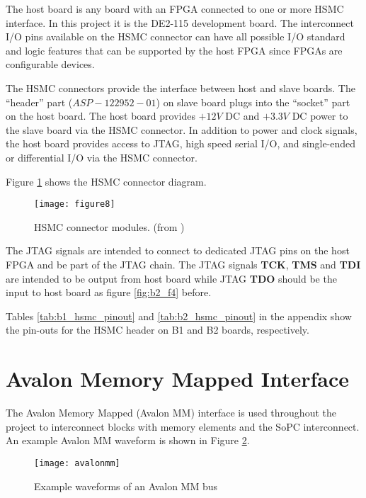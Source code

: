The host board is any board with an FPGA connected to one or more HSMC interface. In this project it is the DE2-115 development board.
The interconnect I/O pins available on the HSMC connector can have all possible I/O standard and
logic features that can be supported by the host FPGA since FPGAs are configurable devices.

The HSMC connectors provide the interface between host and slave boards. The ``header''
part ($ASP-122952-01$) on slave board plugs into the ``socket'' part on the host board. The host
board provides $+12V$ DC and $+3.3V$ DC power to the slave board via the HSMC connector.
In addition to power and clock signals, the host board provides access to JTAG,
high speed serial I/O, and single-ended or differential I/O via the HSMC connector.

Figure \ref{fig:b2_f8} shows the HSMC connector diagram.

\begin{figure}
 \centering
 \texttt{[image: figure8]}
 \caption{HSMC connector modules. (from \citep{Altera:2009:HSMCspec})}
 \label{fig:b2_f8}
\end{figure}

The JTAG signals are intended to connect to dedicated JTAG pins on the host FPGA and
be part of the JTAG chain. The JTAG signals \textbf{TCK}, \textbf{TMS} and \textbf{TDI} are intended to be
output from host board while JTAG \textbf{TDO} should be the input to host board as figure \ref{fig:b2_f4} before.

Tables \ref{tab:b1_hsmc_pinout} and \ref{tab:b2_hsmc_pinout} in the appendix show the pin-outs for the HSMC header on B1 and B2 boards, respectively.












\newpage
\section{Avalon Memory Mapped Interface}
The Avalon Memory Mapped (Avalon MM) interface is used throughout the project to interconnect
blocks with memory elements and the SoPC interconnect. An example Avalon MM waveform
is shown in Figure \ref{figure:avalonmm}.
\begin{figure}[h!]
\begin{center}
\texttt{[image: avalonmm]}
\caption{Example waveforms of an Avalon MM bus}
\label{figure:avalonmm}
\end{center}
\end{figure}


